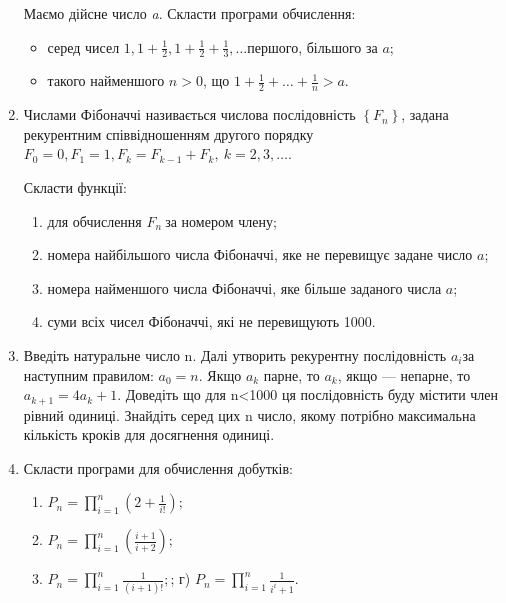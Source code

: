 \documentclass[]{article}
\makeatletter
\newcommand{\xslalph}[1]{\expandafter\@xslalph\csname c@#1\endcsname}
\newcommand{\@xslalph}[1]{%
    \ifcase#1\or а\or б\or в\or г\or д\or e\or є\or ж\or з\or i%
    \or й\or к\or л\or м\or н\or о\or п\or р\or с\or т%
    \or у\or ф\or х\or ц\or ч\or ш\or ю\or я\or аа\or бб\or вв%
    \else\@ctrerr\fi%
}
\makeatother
\begin{document}
\begin{enumerate}
\def\labelenumi{\arabic{enumi})}
  Маємо дійсне число \emph{a}. Скласти програми обчислення:
\begin{itemize}
\item серед чисел
\(1,1 + \frac{1}{2},1 + \frac{1}{2} + \frac{1}{3},\ldots\)першого,
більшого за $a$;

\item такого найменшого $n>0$, що
\(1 + \frac{1}{2} + \ldots + \frac{1}{n} > a\).
\end{itemize}

\item
  Числами Фібоначчі називається числова послідовність
  \(\left\{ F_{n} \right\}\), задана рекурентним співвідношенням другого
  порядку
  \(F_{0} = 0,F_{1} = 1,F_{k} = F_{k - 1} + F_{k},\ k = 2,3,\ldots\).

Скласти функції:
\begin{enumerate}[label=\xslalph*)]
\item
для обчислення \(F_{n}\ \)за номером члену;
\item номера найбільшого числа Фібоначчі, яке не перевищує задане число
$a$;
\item номера найменшого числа Фібоначчі, яке більше заданого числа
$a$;
\item суми всіх чисел Фібоначчі, які не перевищують 1000.

\end{enumerate}

\item
  Введіть натуральне число n. Далі утворить рекурентну послідовність
  \(a_{i}\)за наступним правилом: \(a_{0} = n\). Якщо \(a_{k}\) парне,
  то \(a_{k}\), якщо --- непарне, то\(a_{k + 1} = 4a_{k} + 1\). Доведіть
  що для n\textless{}1000 ця послідовність буду містити член рівний
  одиниці. Знайдіть серед цих n число, якому потрібно максимальна
  кількість кроків для досягнення одиниці.
\item
  Скласти програми для обчислення добутків:
\begin{enumerate}[label=\xslalph*)]
\item \(P_{n} = \prod_{i = 1}^{n}\left( 2 + \frac{1}{i!} \right);\) 
\item
\(P_{n} = \prod_{i = 1}^{n}\left( \frac{i + 1}{i + 2} \right);\)
\item
\(P_{n} = \prod_{i = 1}^{n}\frac{1}{(i + 1)!};\); г)
\(P_{n} = \prod_{i = 1}^{n}\frac{1}{i^{i} + 1}.\)
\end{enumerate}


\end{enumerate}
\end{document}
